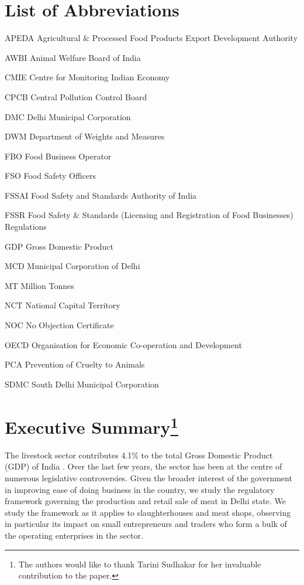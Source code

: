 \documentclass[a4paper, 12pt, twoside]{article}
\begin{document}
\section*{List of Abbreviations}
\begin{abbrv}
\item[APEDA] Agricultural \& Processed Food Products Export Development Authority
\item[AWBI] Animal Welfare Board of India
\item[CMIE] Centre for Monitoring Indian Economy
\item[CPCB] Central Pollution Control Board
\item[DMC] Delhi Municipal Corporation
\item[DWM] Department of Weights and Measures
\item[FBO] Food Business Operator
\item[FSO] Food Safety Officers
\item[FSSAI] Food Safety and Standards Authority of India
\item[FSSR] Food Safety \& Standards (Licensing and Registration of Food Businesses) Regulations
\item[GDP] Gross Domestic Product
\item[MCD] Municipal Corporation of Delhi
\item[MT] Million Tonnes
\item[NCT] National Capital Territory
\item[NOC] No Objection Certificate
\item[OECD] Organisation for Economic Co-operation and Development
\item[PCA] Prevention of Cruelty to Animals
\item[SDMC] South Delhi Municipal Corporation 
\end{abbrv}
\newpage
\section*{Executive Summary\footnote{The authors would like to thank Tarini Sudhakar for her invaluable contribution to the paper.}}

The livestock sector contributes 4.1\% to the total Gross Domestic Product (GDP) of India \parencite{economicreport}. Over the last few years, the sector has been at the centre of numerous legislative controversies. Given the broader interest of the government in improving ease of doing business in the country, we study the regulatory framework governing the production and retail sale of meat in Delhi state. We study the framework as it applies to slaughterhouses and meat shops, observing in particular its impact on small entrepreneurs and traders who form a bulk of the operating enterprises in the sector.\\
\end{document}
